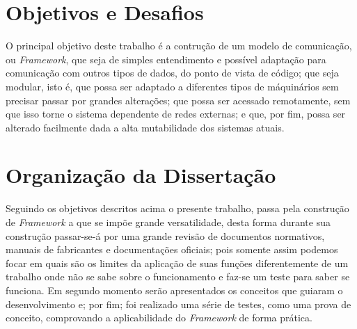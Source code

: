 \section{Objetivos e Desafios}
O principal objetivo deste trabalho é a contrução de um modelo de comunicação, ou \textit{Framework}, que seja de simples
entendimento e possível adaptação para comunicação com outros tipos de dados, do ponto de vista de código; que seja 
modular, isto é, que possa ser adaptado a diferentes tipos de máquinários sem precisar passar por grandes alterações;
que possa ser acessado remotamente, sem que isso torne o sistema dependente de redes externas; e que, por fim, possa ser 
alterado facilmente dada a alta mutabilidade dos sistemas atuais.   

\section{Organização da Dissertação}
Seguindo os objetivos descritos acima o presente trabalho, passa pela construção de \textit{Framework} a que se impõe grande versatilidade,
desta forma durante sua construção passar-se-á por uma grande revisão de documentos normativos, manuais de fabricantes e 
documentações oficiais; pois somente assim podemos focar em quais são os limites da aplicação de suas funções diferentemente
de um trabalho onde não se sabe sobre o funcionamento e faz-se um teste para saber se funciona. Em segundo momento serão 
apresentados os conceitos que guiaram o desenvolvimento e; por fim; foi realizado uma série de testes, como uma prova de
conceito, comprovando a aplicabilidade do \textit{Framework} de forma prática.

